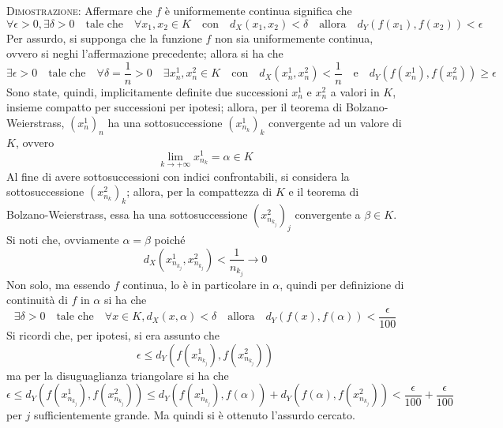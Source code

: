 \documentclass[a4paper]{extarticle}
\begin{document}
\vspace{2em}
\noindent
\normalfont \normalsize
\textsc{Dimostrazione}: Affermare che $f$ è uniformemente continua significa che
\[\forall \epsilon > 0, \exists \delta > 0 \hspace{1em} \text{tale che} \hspace{1em} \forall x_1,x_2 \in K \hspace{1em} \text{con} \hspace{1em} d_X(x_1,x_2) < \delta \hspace{1em} \text{allora} \hspace{1em} d_Y(f(x_1),f(x_2)) < \epsilon\]
Per assurdo, si supponga che la funzione $f$ non sia uniformemente continua, ovvero si neghi l'affermazione precedente; allora si ha che
\[\exists \epsilon > 0 \hspace{1em} \text{tale che} \hspace{1em} \forall \delta = \frac{1}{n} > 0 \hspace{1em} \exists x^1_n,x^2_n \in K \hspace{1em} \text{con} \hspace{1em} d_X(x^1_n,x^2_n) < \frac{1}{n} \hspace{1em} \text{e} \hspace{1em} d_Y(f(x^1_n),f(x^2_n)) \geq \epsilon\]
Sono state, quindi, implicitamente definite due successioni $x^1_n$ e $x^2_n$ a valori in $K$, insieme compatto per successioni per ipotesi; allora, per il teorema di Bolzano-Weierstrass, $(x^1_n)_n$ ha una sottosuccessione $(x^1_{n_k})_{k}$ convergente ad un valore di $K$, ovvero
\[\lim_{k \to +\infty} x^1_{n_{k}} = \alpha \in K\]
Al fine di avere sottosuccessioni con indici confrontabili, si considera la sottosuccessione $(x^2_{n_k})_k$; allora, per la compattezza di $K$ e il teorema di Bolzano-Weierstrass, essa ha una sottosuccessione $(x^2_{n_{k_j}})_j$ convergente a $\beta \in K$. Si noti che, ovviamente $\alpha = \beta$ poiché
\[d_X(x^1_{n_{k_j}},x^2_{n_{k_j}}) < \frac{1}{n_{k_j}} \to 0\]
Non solo, ma essendo $f$ continua, lo è in particolare in $\alpha$, quindi per definizione di continuità di $f$ in $\alpha$ si ha che
\[\exists \delta > 0 \hspace{1em} \text{tale che} \hspace{1em} \forall x \in K, d_X(x,\alpha) < \delta \hspace{1em} \text{allora} \hspace{1em} d_Y(f(x),f(\alpha)) < \frac{\epsilon}{100}\]
Si ricordi che, per ipotesi, si era assunto che
\[\epsilon \leq d_Y(f(x^1_{n_{k_j}}),f(x^2_{n_{k_j}}))\]
ma per la disuguaglianza triangolare si ha che
\[\epsilon \leq d_Y(f(x^1_{n_{k_j}}),f(x^2_{n_{k_j}})) \leq d_Y(f(x^1_{n_{k_j}}),f(\alpha)) + d_Y(f(\alpha),f(x^2_{n_{k_j}})) < \dfrac{\epsilon}{100} + \dfrac{\epsilon}{100}\]
per $j$ sufficientemente grande. Ma quindi si è ottenuto l'assurdo cercato.
\end{document}
